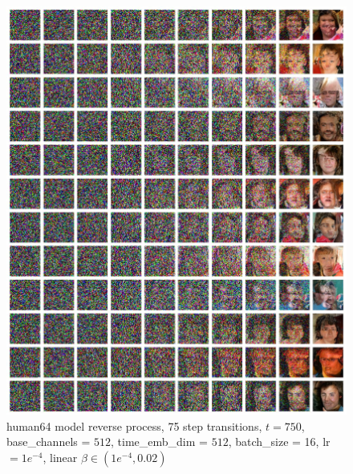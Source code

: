 \documentclass[12pt]{article}
\begin{document}
\begin{figure}[H]
  \centering
  \includegraphics[width=1\textwidth]{human64rev.jpg}
  \caption{human64 model reverse process, 75 step transitions, $t=750$, base\_channels = $512$, time\_emb\_dim = $512$, batch\_size = 16, lr$=1e^{-4}$, linear $\beta \in(1e^{-4}, 0.02)$}
\end{figure}
\end{document}
